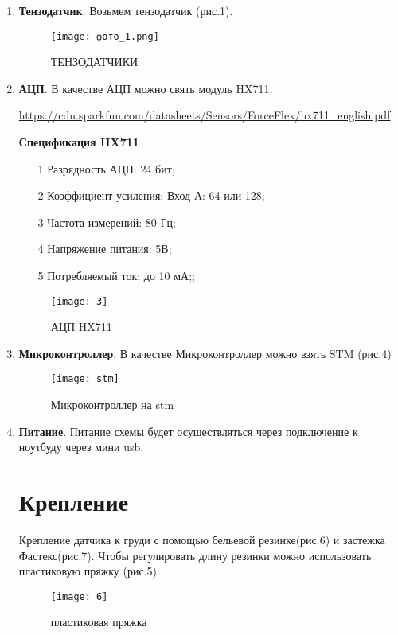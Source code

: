 \begin{enumerate}
\item \textbf{Тензодатчик}. Возьмем тензодатчик (рис.1).


	\begin{figure}[h]
		\centering
		\texttt{[image: фото\_1.png]}
		\caption{ТЕНЗОДАТЧИКИ}
	\end{figure}


\item \textbf{АЦП}. В качестве АЦП можно свять модуль HX711. 

\url{https://cdn.sparkfun.com/datasheets/Sensors/ForceFlex/hx711_english.pdf}

\textbf{Спецификация HX711}
 \begin{enumerate}
 \item[1] Разрядность АЦП: 24 бит;
 \item[2] Коэффициент усиления: Вход А: 64 или 128;
 \item[3] Частота измерений: 80 Гц;
 \item[4] Напряжение питания: 5В;
 \item[5] Потребляемый ток: до 10 мА;;
 \end{enumerate}
\newpage

	\begin{figure}[h]
		\centering
		\texttt{[image: 3]}
		\caption{АЦП HX711}
	\end{figure}

\item \textbf{Микроконтроллер}. В качестве Микроконтроллер можно взять STM (рис.4)

	\begin{figure}[h]
		\centering
		\texttt{[image: stm]}
		\caption{Микроконтроллер на stm}
	\end{figure}

\item \textbf{Питание}. Питание схемы будет осуществляться через подключение к ноутбуду через мини usb. 

\section{Крепление}

Крепление датчика к груди с помощью бельевой резинке(рис.6) и застежка Фастекс(рис.7). Чтобы регулировать длину резинки можно использовать пластиковую пряжку (рис.5).

	\begin{figure}[h]
		\centering
		\texttt{[image: 6]}
		\caption{пластиковая пряжка}
	\end{figure}


\end{enumerate}
